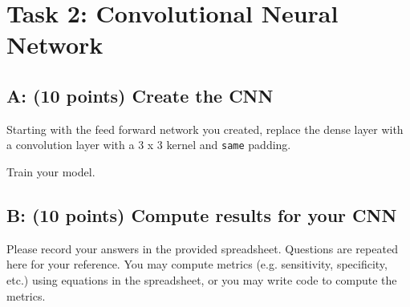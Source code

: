 \documentclass[11pt]{article}
\renewcommand\:{\colon} %
\begin{document}
\section{Task 2: Convolutional Neural Network}
\subsection{A: (10 points) Create the CNN}

Starting with the feed forward network you created, replace the dense layer with a convolution layer with a 3 x 3 kernel and \texttt{same} padding.

Train your model.

\subsection{B: (10 points) Compute results for your CNN}

Please record your answers in the provided spreadsheet. Questions are repeated here for your reference. You may compute metrics (e.g. sensitivity, specificity, etc.) using equations in the spreadsheet, or you may write code to compute the metrics.
\end{document}
